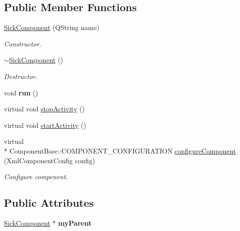 \subsection*{Public Member Functions}
\begin{DoxyCompactItemize}
\item 
\hypertarget{classpacpus_1_1SickComponent_a173293f307240ec6872d5be9a8790c56}{\hyperlink{classpacpus_1_1SickComponent_a173293f307240ec6872d5be9a8790c56}{Sick\-Component} (Q\-String name)}\label{classpacpus_1_1SickComponent_a173293f307240ec6872d5be9a8790c56}

\begin{DoxyCompactList}\small\item\em Constructor. \end{DoxyCompactList}\item 
\hypertarget{classpacpus_1_1SickComponent_a318cc1a398812c71a47661b22ff36e22}{\hyperlink{classpacpus_1_1SickComponent_a318cc1a398812c71a47661b22ff36e22}{$\sim$\-Sick\-Component} ()}\label{classpacpus_1_1SickComponent_a318cc1a398812c71a47661b22ff36e22}

\begin{DoxyCompactList}\small\item\em Destructor. \end{DoxyCompactList}\item 
\hypertarget{classpacpus_1_1SickComponent_a61c8eea3d4878b769fcaee1e00d3c471}{void {\bfseries run} ()}\label{classpacpus_1_1SickComponent_a61c8eea3d4878b769fcaee1e00d3c471}

\item 
virtual void \hyperlink{classpacpus_1_1SickComponent_a4524cb582e5fdf9dbd059072bea0d49b}{stop\-Activity} ()
\item 
virtual void \hyperlink{classpacpus_1_1SickComponent_a93980139bab330f3ef6bf818afba70a2}{start\-Activity} ()
\item 
virtual \\*
Component\-Base\-::\-C\-O\-M\-P\-O\-N\-E\-N\-T\-\_\-\-C\-O\-N\-F\-I\-G\-U\-R\-A\-T\-I\-O\-N \hyperlink{classpacpus_1_1SickComponent_accc413cdd2c4f5b8aacb14655b8a86d2}{configure\-Component} (Xml\-Component\-Config config)
\begin{DoxyCompactList}\small\item\em Configure compenent. \end{DoxyCompactList}\end{DoxyCompactItemize}
\subsection*{Public Attributes}
\begin{DoxyCompactItemize}
\item 
\hypertarget{classpacpus_1_1SickComponent_a4ac4764e115fb41e6e9df77e05bcb14f}{\hyperlink{classpacpus_1_1SickComponent}{Sick\-Component} $\ast$ {\bfseries my\-Parent}}\label{classpacpus_1_1SickComponent_a4ac4764e115fb41e6e9df77e05bcb14f}

\end{DoxyCompactItemize}


